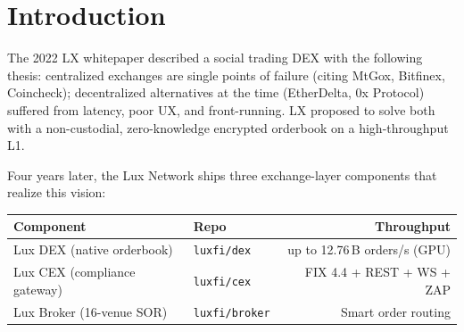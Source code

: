 \section{Introduction}


The 2022 LX whitepaper described a social trading DEX with the
following thesis: centralized exchanges are single points of failure
(citing MtGox, Bitfinex, Coincheck); decentralized alternatives
at the time (EtherDelta, 0x Protocol) suffered from latency, poor
UX, and front-running. LX proposed to solve both with a non-custodial,
zero-knowledge encrypted orderbook on a high-throughput L1.

Four years later, the Lux Network ships three exchange-layer
components that realize this vision:

\begin{center}
\begin{tabular}{llr}
\toprule
\textbf{Component} & \textbf{Repo} & \textbf{Throughput} \\
\midrule
Lux DEX (native orderbook) & \texttt{luxfi/dex} & up to 12.76\,B orders/s (GPU) \\
Lux CEX (compliance gateway) & \texttt{luxfi/cex} & FIX 4.4 + REST + WS + ZAP \\
Lux Broker (16-venue SOR) & \texttt{luxfi/broker} & Smart order routing \\
\bottomrule
\end{tabular}
\end{center}

